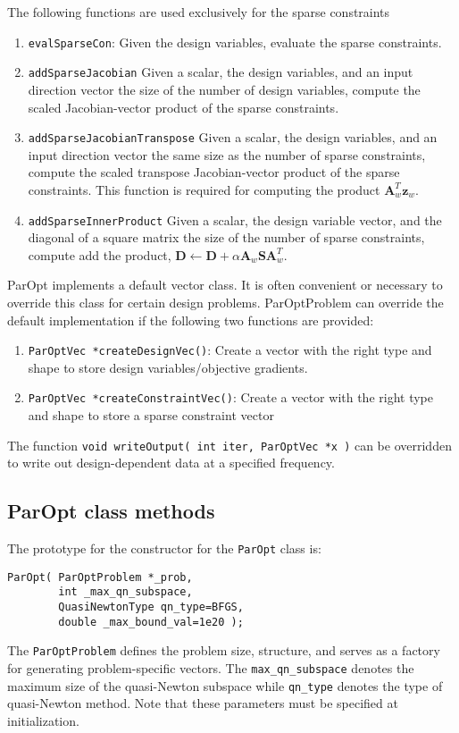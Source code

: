 \documentclass[12pt]{article}
\newcommand{\mb}{\mathbf}
\begin{document}
The following functions are used exclusively for the sparse constraints
%
\begin{enumerate}
\item \texttt{evalSparseCon}: Given the design variables, evaluate the sparse constraints.

\item \texttt{addSparseJacobian} Given a scalar, the design variables, and an input direction vector the size of the number of design variables, compute the scaled Jacobian-vector product of the sparse constraints.

\item \texttt{addSparseJacobianTranspose} Given a scalar, the design variables, and an input direction vector the same size as the number of sparse constraints, compute the scaled transpose Jacobian-vector product of the sparse constraints. This function is required for computing the product $\mb{A}_{w}^{T}\mb{z}_{w}$.

\item \texttt{addSparseInnerProduct} Given a scalar, the design variable vector, and the diagonal of a square matrix the size of the number of sparse constraints, compute add the product, $\mb{D} \leftarrow \mb{D} + \alpha \mb{A}_{w} \mb{S}\mb{A}_{w}^{T}$.
\end{enumerate}


ParOpt implements a default vector class. 
It is often convenient or necessary to override this class for certain design problems.
ParOptProblem can override the default implementation if the following two functions are provided:
\begin{enumerate}
\item \texttt{ParOptVec *createDesignVec()}: Create a vector with the right type and shape to store design variables/objective gradients.
\item \texttt{ParOptVec *createConstraintVec()}: Create a vector with the right type and shape to store a sparse constraint vector
\end{enumerate}  

The function \texttt{void writeOutput( int iter, ParOptVec *x )} can be overridden to write out design-dependent data at a specified frequency.
  
\subsection{ParOpt class methods}

The prototype for the constructor for the \texttt{ParOpt} class is:
%
\begin{verbatim}
ParOpt( ParOptProblem *_prob,
        int _max_qn_subspace,
        QuasiNewtonType qn_type=BFGS,
        double _max_bound_val=1e20 );
\end{verbatim}
%
The \texttt{ParOptProblem} defines the problem size, structure, and serves as a factory for generating problem-specific vectors.
The \texttt{max\_qn\_subspace} denotes the maximum size of the quasi-Newton subspace while \texttt{qn\_type} denotes the type of quasi-Newton method. Note that these parameters must be specified at initialization.
\end{document}
